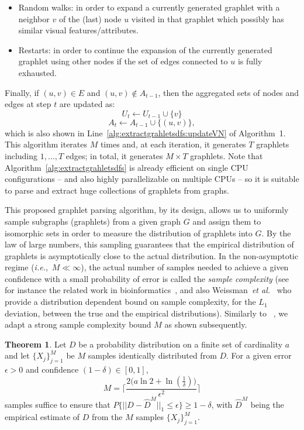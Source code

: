 \documentclass[journal]{IEEEtran}
\theoremstyle{definition}
\newtheorem{theorem}{Theorem}
\newcommand{\etal}{\textit{et al.}}
\newcommand{\ie}{\textit{i.e.}}
\newcommand{\alg}[1]{Algorithm~\ref{#1}}
\newcommand{\lin}[1]{Line~\ref{#1}}
\begin{document}
\begin{itemize}
\item Random walks: in order to expand a currently generated graphlet with a neighbor $v$ of the (last) node $u$ visited in that graphlet which possibly has similar visual features/attributes.
\item Restarts: in order to continue the expansion of the currently generated graphlet using other nodes if the set of edges connected to $u$ is fully exhausted.
\end{itemize}
Finally, if $(u,v) \in E$ and $(u,v) \notin A_{t-1}$, then the aggregated sets of nodes and edges at step $t$ are updated as:
 \begin{equation*}
U_t \leftarrow U_{t-1} \cup \{v\}
\end{equation*}
\begin{equation*}
 A_t \leftarrow A_{t-1} \cup \{(u,v)\},
\end{equation*}
\noindent which is also shown in \lin{alg:extractgrahletsdfs:updateVN} of Algorithm~1.\\
\noindent This algorithm iterates $M$ times and, at each iteration, it generates $T$ graphlets including $1,\ldots,T$ edges; in total, it generates $M\times T$ graphlets. Note that \alg{alg:extractgrahletsdfs} is already efficient on single CPU configurations -- and also highly parallelizable on multiple CPUs -- so it is suitable to parse and extract huge collections of graphlets from graphs.

This proposed graphlet parsing algorithm, by its design, allows us to uniformly sample subgraphs (graphlets) from a given graph $G$ and assign them to isomorphic sets in order to measure the distribution of graphlets into $G$. By the law of large numbers, this sampling guarantees that the empirical distribution of graphlets is asymptotically close to the actual distribution. In the non-asymptotic regime (\ie,~$M \ll \infty$), the actual number of samples needed to achieve a given confidence with a small probability of error is called the \emph{sample complexity} (see for instance the related work in bioinformatics~\cite{Przulj2007}, \cite{Shervashidze2009} and also Weissman~\etal~\cite{Weissman2003} who provide a distribution dependent bound on sample complexity, for the $L_1$ deviation, between the true and the empirical distributions). Similarly to ~\cite{Shervashidze2009}, we adapt a strong sample complexity bound $M$ as shown subsequently.
\begin{theorem}
Let $D$ be a probability distribution on a finite set of cardinality $\mathit{a}$ and let $\lbrace X_j\rbrace_{j=1}^M$ be $M$ samples identically distributed from $D$. For a given error $\epsilon>0$ and confidence $(1-\delta) \in [0,1]$, 
\begin{equation*}
M=\Bigg\lceil \frac{2\Big(\mathit{a}\ln2+\ln(\frac{1}{\delta})\Big)}{\epsilon^2}\Bigg\rceil
\end{equation*}
samples suffice to ensure that $P\Big\lbrace ||D-\hat{D}^M||_1\leq\epsilon\Big\rbrace\geq1-\delta$, with $\hat{D}^M$ being the empirical estimate of $D$ from the $M$ samples $\lbrace X_j\rbrace_{j=1}^M$. 
\label{thm:sample-compl}
\end{theorem}
 
\end{document}
